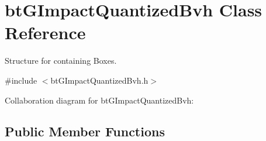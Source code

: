 \hypertarget{classbt_g_impact_quantized_bvh}{\section{bt\+G\+Impact\+Quantized\+Bvh Class Reference}
\label{classbt_g_impact_quantized_bvh}
}


Structure for containing Boxes.  




{\ttfamily \#include $<$bt\+G\+Impact\+Quantized\+Bvh.\+h$>$}



Collaboration diagram for bt\+G\+Impact\+Quantized\+Bvh\+:
\subsection*{Public Member Functions}
